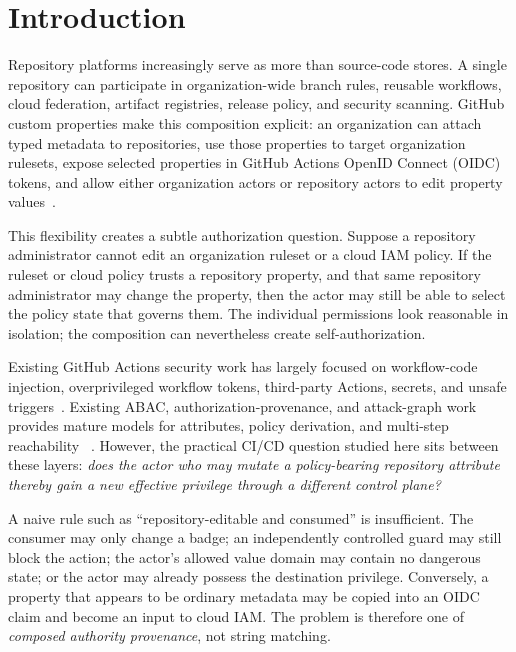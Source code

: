 \documentclass[sigconf,review,anonymous]{acmart}
\begin{document}

\maketitle

\section{Introduction}

Repository platforms increasingly serve as more than source-code stores.  A
single repository can participate in organization-wide branch rules, reusable
workflows, cloud federation, artifact registries, release policy, and security
scanning.  GitHub custom properties make this composition explicit: an
organization can attach typed metadata to repositories, use those properties to
target organization rulesets, expose selected properties in GitHub Actions
OpenID Connect (OIDC) tokens, and allow either organization actors or repository
actors to edit property values~\cite{github-custom-properties,github-rulesets,github-oidc-properties}.

This flexibility creates a subtle authorization question.  Suppose a repository
administrator cannot edit an organization ruleset or a cloud IAM policy.  If the
ruleset or cloud policy trusts a repository property, and that same repository
administrator may change the property, then the actor may still be able to
select the policy state that governs them.  The individual permissions look
reasonable in isolation; the composition can nevertheless create
self-authorization.

Existing GitHub Actions security work has largely focused on workflow-code
injection, overprivileged workflow tokens, third-party Actions, secrets, and
unsafe triggers~\cite{koishybayev2022gha,kubo2026action,boschanski2026docs,shi2026shcrguard}.
Existing ABAC, authorization-provenance, and attack-graph work provides mature
models for attributes, policy derivation, and multi-step reachability
~\cite{hu2010authprov,hu2015abac,konsta2024attackgraphs}.  However, the practical
CI/CD question studied here sits between these layers: \emph{does the actor who
may mutate a policy-bearing repository attribute thereby gain a new effective
privilege through a different control plane?}

A naive rule such as ``repository-editable and consumed'' is insufficient.  The
consumer may only change a badge; an independently controlled guard may still
block the action; the actor's allowed value domain may contain no dangerous
state; or the actor may already possess the destination privilege.  Conversely,
a property that appears to be ordinary metadata may be copied into an OIDC
claim and become an input to cloud IAM.  The problem is therefore one of
\emph{composed authority provenance}, not string matching.
\end{document}
